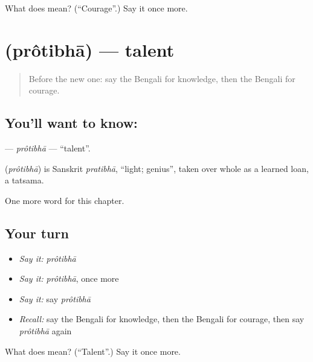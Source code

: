 \begin{tcolorbox}[breakable,colback=teal!4,colframe=teal!35!black,title={Before you move on}]
What does  mean? (\textquotedblleft{}Courage\textquotedblright{}.) Say it once more.
\end{tcolorbox}
\section[\texorpdfstring{\bn{প্রতিভা} (prôtibhā)}{প্রতিভা (prôtibhā)}]{ (prôtibhā) — talent}

\label{lesson:BN-C100-protibha}



\begin{quote}
Before the new one: say the Bengali for knowledge, then the Bengali for courage.
\end{quote}

\subsection*{You'll want to know: }
\textbf{} — \emph{prôtibhā} — \textquotedblleft{}talent\textquotedblright{}.

\begin{cousinweb}
\textbf{} (\emph{prôtibhā}) is Sanskrit \emph{pratibhā}, \textquotedblleft{}light; genius\textquotedblright{}, taken over whole as a learned loan, a tatsama.
\end{cousinweb}

\begin{grammarlens}[title={What you've built}]
One more word for this chapter.
\end{grammarlens}

\subsection*{Your turn}
\begin{itemize}
\raggedright
  \item \emph{Say it:} \emph{prôtibhā}
  \item \emph{Say it:} \emph{prôtibhā}, once more
  \item \emph{Say it:} say \emph{prôtibhā}
  \item \emph{Recall:} say the Bengali for knowledge, then the Bengali for courage, then say \emph{prôtibhā} again
\end{itemize}

\begin{tcolorbox}[breakable,colback=teal!4,colframe=teal!35!black,title={Before you move on}]
What does  mean? (\textquotedblleft{}Talent\textquotedblright{}.) Say it once more.
\end{tcolorbox}
